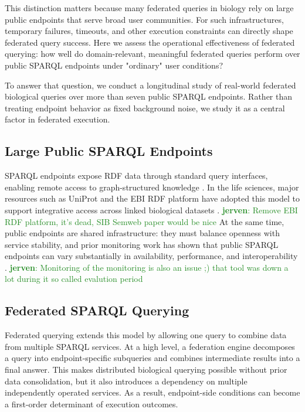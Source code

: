 \documentclass[runningheads]{llncs}
\newcommand{\jerven}[1]{\textcolor{ForestGreen}{\textbf{jerven}: #1}}
\begin{document}
This distinction matters because many federated queries in biology rely on large public endpoints that serve broad user communities. 
For such infrastructures, temporary failures, timeouts, and other execution constraints can directly shape federated query success. 
Here we assess the operational effectiveness of federated querying: how well do domain-relevant, meaningful federated queries perform over public SPARQL endpoints under "ordinary" user conditions?

To answer that question, we conduct a longitudinal study of real-world federated biological queries over more than seven public SPARQL endpoints. 
Rather than treating endpoint behavior as fixed background noise, we study it as a central factor in federated execution. 

\subsection{Large Public SPARQL Endpoints}\label{sec1.1}
SPARQL endpoints expose RDF data through standard query interfaces, enabling remote access to graph-structured knowledge \cite{Harris2013SPARQL,Feigenbaum2013Protocol}. 
In the life sciences, major resources such as UniProt and the EBI RDF platform have adopted this model to support integrative access across linked biological datasets \cite{UniProt2025}. \jerven{Remove EBI RDF platform, it's dead, SIB Semweb paper would be nice}
At the same time, public endpoints are shared infrastructure: they must balance openness with service stability, and prior monitoring work has shown that public SPARQL endpoints can vary substantially in availability, performance, and interoperability \cite{Vandenbussche2017SPARQLES}. \jerven{Monitoring of the monitoring is also an issue ;) that tool was down a lot during it so called evalution period}

\subsection{Federated SPARQL Querying}\label{sec1.2}
Federated querying extends this model by allowing one query to combine data from multiple SPARQL services. 
At a high level, a federation engine decomposes a query into endpoint-specific subqueries and combines intermediate results into a final answer. 
This makes distributed biological querying possible without prior data consolidation, but it also introduces a dependency on multiple independently operated services. 
As a result, endpoint-side conditions can become a first-order determinant of execution outcomes. 
\end{document}

